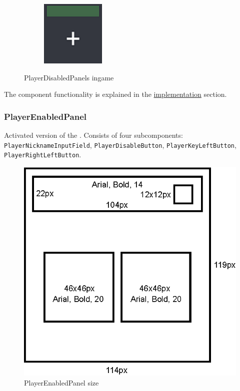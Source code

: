\begin{figure}[h!]
\begin{subfigure}{0.185\textwidth}
	\end{subfigure}
	\begin{subfigure}{0.185\textwidth}
		\centering
		\includegraphics[scale=1, frame]{gui-imgs/player6disabledpanel}
	\end{subfigure}
	\caption{PlayerDisabledPanels ingame}
\end{figure}

\noindent The component functionality is explained in the \hyperref[gui-implementation]{implementation} section.

\subsubsection{PlayerEnabledPanel}\label{gui-playerenabledpanel}
\noindent Activated version of the . Consists of four subcomponents: \verb|PlayerNicknameInputField|, \verb|PlayerDisableButton|, \verb|PlayerKeyLeftButton|, \verb|PlayerRightLeftButton|.

\begin{figure}[h!]\centering
	\hspace*{.75cm}\includegraphics[scale=1]{gui-imgs/playerenabledpanel-size}
	\caption{PlayerEnabledPanel size}
\end{figure}

